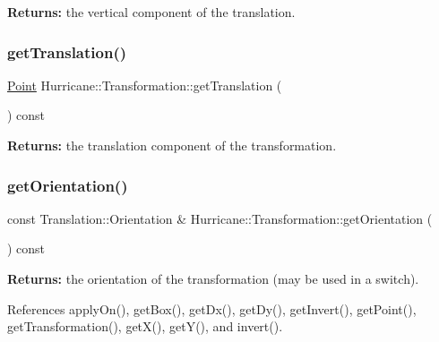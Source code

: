 {\bfseries Returns\+:} the vertical component of the translation. \mbox{\label{classHurricane_1_1Transformation_a45a5133c16af3ce80ffd084b02064013}} 
\subsubsection{\texorpdfstring{get\+Translation()}{getTranslation()}}
{\footnotesize\ttfamily \hyperlink{classHurricane_1_1Point}{Point} Hurricane\+::\+Transformation\+::get\+Translation (\begin{DoxyParamCaption}{ }\end{DoxyParamCaption}) const\hspace{0.3cm}{\ttfamily [inline]}}

{\bfseries Returns\+:} the translation component of the transformation. \mbox{\label{classHurricane_1_1Transformation_ad1f4de093e3b87783b2b931444acbb76}} 
\subsubsection{\texorpdfstring{get\+Orientation()}{getOrientation()}}
{\footnotesize\ttfamily const Translation\+::\+Orientation \& Hurricane\+::\+Transformation\+::get\+Orientation (\begin{DoxyParamCaption}{ }\end{DoxyParamCaption}) const\hspace{0.3cm}{\ttfamily [inline]}}

{\bfseries Returns\+:} the orientation of the transformation (may be used in a switch). 

References apply\+On(), get\+Box(), get\+Dx(), get\+Dy(), get\+Invert(), get\+Point(), get\+Transformation(), get\+X(), get\+Y(), and invert().

\mbox{\label{classHurricane_1_1Transformation_af3b16accc64a12c5dcd4c099115a93f3}} 
